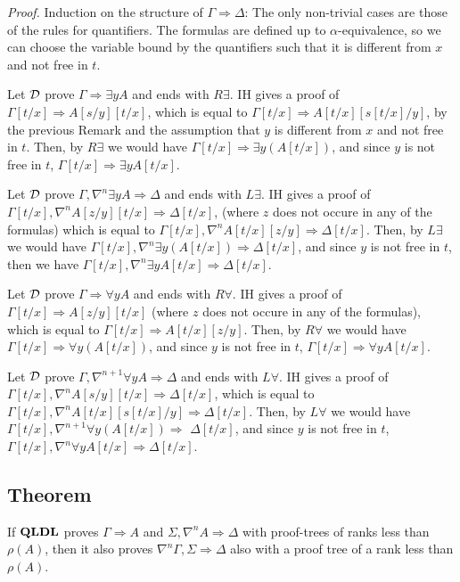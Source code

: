 \documentclass[a4paper, 12pt]{paper}
\begin{document}
\emph{Proof.} Induction on the structure of $\Gamma \Rightarrow \Delta$:
The only non-trivial cases are those of the rules for quantifiers. The formulas are defined up to $\alpha$-equivalence, so we can choose the variable bound by the quantifiers such that it is different from $x$ and not free in $t$.

Let $\mathcal{D}$ prove $\Gamma \Rightarrow \exists y A$ and ends with $R \exists$. IH gives a proof of $\Gamma[t/x] \Rightarrow A[s/y][t/x]$, which is equal to $\Gamma[t/x] \Rightarrow A[t/x][s[t/x]/y]$, by the previous Remark and the assumption that $y$ is different from $x$ and not free in $t$. Then, by $R \exists$ we would have $\Gamma[t/x] \Rightarrow \exists y (A[t/x])$, and since $y$ is not free in $t$, $\Gamma[t/x] \Rightarrow \exists y A [t/x]$.

Let $\mathcal{D}$ prove $\Gamma, \nabla^n \exists y A \Rightarrow \Delta$ and ends with $L \exists$. IH gives a proof of $\Gamma[t/x], \nabla^n A[z/y][t/x] \Rightarrow \Delta[t/x]$, (where $z$ does not occure in any of the formulas) which is equal to $\Gamma[t/x], \nabla^n A[t/x][z/y] \Rightarrow \Delta[t/x]$. Then, by $L \exists$ we would have $\Gamma[t/x], \nabla^n \exists y (A[t/x]) \Rightarrow \Delta[t/x]$, and since $y$ is not free in $t$, then we have $\Gamma[t/x], \nabla^n \exists y A [t/x] \Rightarrow \Delta[t/x]$.

Let $\mathcal{D}$ prove $\Gamma \Rightarrow \forall y A$ and ends with $R \forall$. IH gives a proof of $\Gamma[t/x] \Rightarrow A[z/y][t/x]$ (where $z$ does not occure in any of the formulas), which is equal to $\Gamma[t/x] \Rightarrow A[t/x][z/y]$. Then, by $R \forall$ we would have $\Gamma[t/x] \Rightarrow \forall y (A[t/x])$, and since $y$ is not free in $t$, $\Gamma[t/x] \Rightarrow \forall y A [t/x]$.

Let $\mathcal{D}$ prove $\Gamma, \nabla^{n+1} \forall y A \Rightarrow \Delta$ and ends with $L \forall$. IH gives a proof of $\Gamma[t/x], \nabla^n A[s/y][t/x] \Rightarrow \Delta[t/x]$, which is equal to $\Gamma[t/x], \nabla^n A[t/x][s[t/x]/y] \Rightarrow \Delta[t/x]$. Then, by $L \forall$ we would have $\Gamma[t/x], \nabla^{n+1} \forall y (A[t/x]) \Rightarrow$ $\Delta[t/x]$, and since $y$ is not free in $t$, $\Gamma[t/x], \nabla^n \forall y A [t/x] \Rightarrow \Delta[t/x]$.



\subsection{Theorem} If $\mathbf{QLDL}$ proves $\Gamma \Rightarrow A$ and $\Sigma , \nabla^n A \Rightarrow \Delta$ with proof-trees of ranks less than $\rho(A)$, then it also proves $\nabla^n \Gamma, \Sigma \Rightarrow \Delta$ also with a proof tree of a rank less than $\rho(A)$.
\end{document}
